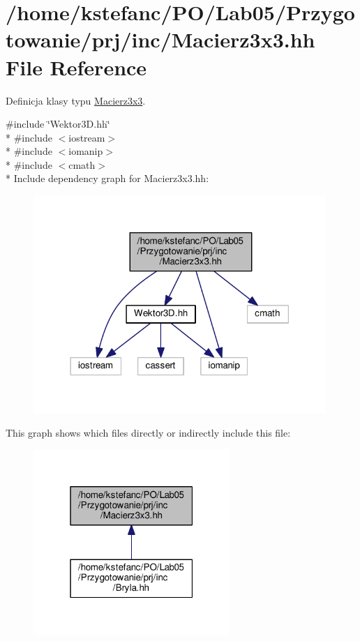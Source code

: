 \hypertarget{_macierz3x3_8hh}{\section{/home/kstefanc/\+P\+O/\+Lab05/\+Przygotowanie/prj/inc/\+Macierz3x3.hh File Reference}
\label{_macierz3x3_8hh}
}


Definicja klasy typu \hyperlink{class_macierz3x3}{Macierz3x3}.  


{\ttfamily \#include \char`\"{}Wektor3\+D.\+hh\char`\"{}}\\*
{\ttfamily \#include $<$iostream$>$}\\*
{\ttfamily \#include $<$iomanip$>$}\\*
{\ttfamily \#include $<$cmath$>$}\\*
Include dependency graph for Macierz3x3.\+hh\+:\nopagebreak
\begin{figure}[H]
\begin{center}
\leavevmode
\includegraphics[width=314pt]{_macierz3x3_8hh__incl}
\end{center}
\end{figure}
This graph shows which files directly or indirectly include this file\+:\nopagebreak
\begin{figure}[H]
\begin{center}
\leavevmode
\includegraphics[width=211pt]{_macierz3x3_8hh__dep__incl}
\end{center}
\end{figure}

